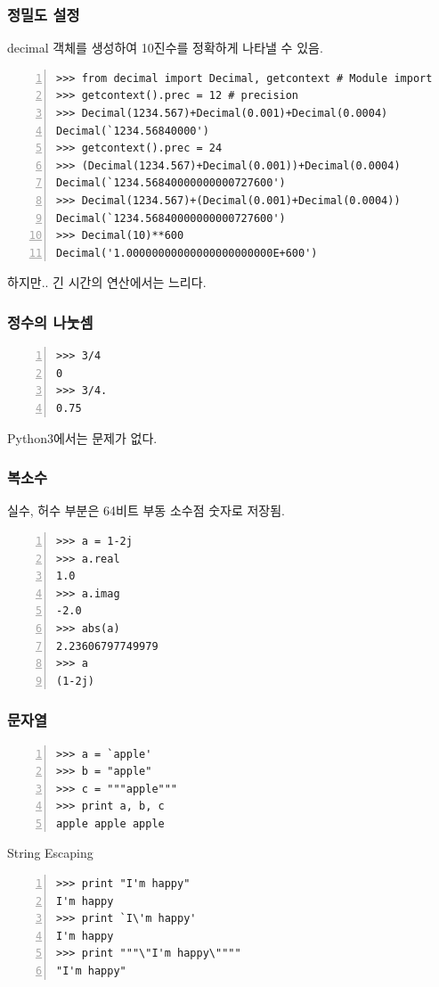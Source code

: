 \documentclass[10pt]{beamer}
\begin{document}
\begin{frame}[fragile]
\frametitle{정밀도 설정}
decimal 객체를 생성하여 10진수를 정확하게 나타낼 수 있음.\\
\vspace{2mm}
\begin{Verbatim}[numbers=left,commandchars=\\\{\}]
>>> from decimal import Decimal, getcontext # Module import
>>> getcontext().prec = 12 # precision
>>> Decimal(1234.567)+Decimal(0.001)+Decimal(0.0004)
Decimal(`1234.56840000')
>>> getcontext().prec = 24
>>> (Decimal(1234.567)+Decimal(0.001))+Decimal(0.0004)
Decimal(`1234.56840000000000727600')
>>> Decimal(1234.567)+(Decimal(0.001)+Decimal(0.0004))
Decimal(`1234.56840000000000727600')
>>> Decimal(10)**600
Decimal('1.00000000000000000000000E+600')
\end{Verbatim}
\vspace{2mm}
하지만.. 긴 시간의 연산에서는 느리다.
\end{frame}

\begin{frame}[fragile]
\frametitle{정수의 나눗셈}
\begin{Verbatim}[numbers=left,commandchars=\\\{\}]
>>> 3/4
0
>>> 3/4.
0.75
\end{Verbatim}
\vspace{2mm}
Python3에서는 문제가 없다.
\end{frame}

\begin{frame}[fragile]
\frametitle{복소수}
실수, 허수 부분은 64비트 부동 소수점 숫자로 저장됨.
\begin{Verbatim}[numbers=left,commandchars=\\\{\}]
>>> a = 1-2j
>>> a.real
1.0
>>> a.imag
-2.0
>>> abs(a)
2.23606797749979
>>> a
(1-2j)
\end{Verbatim}
\end{frame}

\begin{frame}[fragile]
\frametitle{문자열}
\begin{Verbatim}[numbers=left,commandchars=\\\{\}]
>>> a = `apple'
>>> b = "apple"
>>> c = """apple"""
>>> print a, b, c
apple apple apple
\end{Verbatim}
\vspace{2mm}
String Escaping
\begin{Verbatim}[numbers=left]
>>> print "I'm happy"
I'm happy
>>> print `I\'m happy'
I'm happy
>>> print """\"I'm happy\""""
"I'm happy"
\end{Verbatim}
\end{frame}
\end{document}
